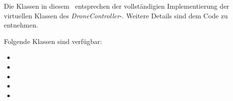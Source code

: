 
Die Klassen in diesem \Pack\ entsprechen der vollständigien Implementierung der virtuellen Klassen des \textit{DroneController}-\Pack. Weitere Details sind dem Code zu entnehmen.

Folgende Klassen sind verfügbar:
\begin{itemize}
\item {}
\item {}
\item {}
\item {}
\item {}
\end{itemize}





